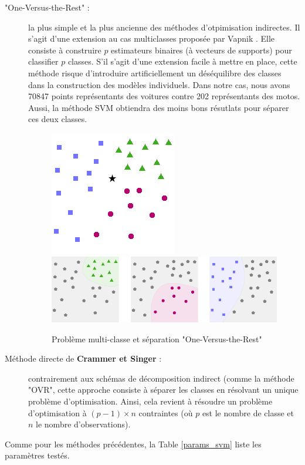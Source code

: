 \documentclass[a4paper]{report}
\begin{document}
\begin{description}
\item["One-Versus-the-Rest" :] la plus simple et la plus ancienne des méthodes d'otpimisation indirectes. Il s'agit d'une extension au cas multiclasses proposée par Vapnik \cite{Vapnik}. Elle consiste à construire $p$ estimateurs binaires (à vecteurs de supports) pour classifier $p$ classes. S'il s'agit d'une extension facile à mettre en place, cette méthode risque d'introduire artificiellement un déséquilibre des classes dans la construction des modèles individuels. Dans notre cas, nous avons 70847 points représentants des voitures contre 202 représentants des motos. Aussi, la méthode SVM obtiendra des moins bons résutlats pour séparer ces deux classes.

\begin{figure}
\centering
\includegraphics[scale=0.6]{img/svm.png}
\includegraphics[scale=0.6]{img/svm_OneVsAll.png}
\caption{Problème multi-classe et séparation "One-Versus-the-Rest"}
\end{figure}

\item[Méthode directe de \textbf{Crammer et Singer} \cite{Crammer} :] contrairement aux schémas de décomposition indirect (comme la méthode "OVR", cette approche consiste à séparer les classes en résolvant un unique problème d'optimisation. Ainsi, cela revient à résoudre un problème d'optimisation à $(p-1)\times n$ contraintes (où $p$ est le nombre de classe et $n$ le nombre d'observations).
\end{description}
Comme pour les méthodes précédentes, la Table \ref{params_svm} liste les paramètres testés.
\end{document}

